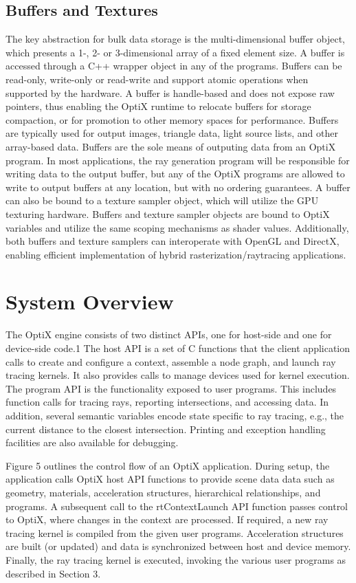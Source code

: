 \subsection{ Buffers and Textures}

The key abstraction for bulk data storage is the multi-dimensional
buffer object, which presents a 1-, 2- or 3-dimensional array of a
fixed element size. A buffer is accessed through a C++ wrapper
object in any of the programs. Buffers can be read-only, write-only
or read-write and support atomic operations when supported by the
hardware. A buffer is handle-based and does not expose raw pointers, thus enabling the OptiX runtime to relocate buffers for storage
compaction, or for promotion to other memory spaces for performance. Buffers are typically used for output images, triangle data,
light source lists, and other array-based data. Buffers are the sole
means of outputing data from an OptiX program. In most applications, the ray generation program will be responsible for writing
data to the output buffer, but any of the OptiX programs are allowed
to write to output buffers at any location, but with no ordering guarantees.
A buffer can also be bound to a texture sampler object, which will
utilize the GPU texturing hardware. Buffers and texture sampler
objects are bound to OptiX variables and utilize the same scoping
mechanisms as shader values. Additionally, both buffers and texture samplers can interoperate with OpenGL and DirectX, enabling
efficient implementation of hybrid rasterization/raytracing applications.

\section{System Overview}

The OptiX engine consists of two distinct APIs, one for host-side
and one for device-side code.1 The host API is a set of C functions that the client application calls to create and configure a context, assemble a node graph, and launch ray tracing kernels. It also
provides calls to manage devices used for kernel execution. The
program API is the functionality exposed to user programs. This
includes function calls for tracing rays, reporting intersections, and
accessing data. In addition, several semantic variables encode state
specific to ray tracing, e.g., the current distance to the closest intersection. Printing and exception handling facilities are also available
for debugging.

Figure 5 outlines the control flow of an OptiX application. During setup, the application calls OptiX host API functions to provide scene data data such as geometry, materials, acceleration structures, hierarchical relationships, and programs. A subsequent call
to the rtContextLaunch API function passes control to OptiX, where
changes in the context are processed. If required, a new ray tracing kernel is compiled from the given user programs. Acceleration
structures are built (or updated) and data is synchronized between
host and device memory. Finally, the ray tracing kernel is executed,
invoking the various user programs as described in Section 3.

